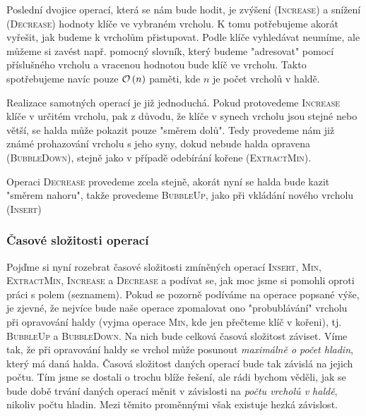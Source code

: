 Poslední dvojice operací, která se nám bude hodit, je zvýšení (\textsc{Increase}) a snížení (\textsc{Decrease}) hodnoty klíče ve vybraném vrcholu. K tomu potřebujeme akorát vyřešit, jak budeme k vrcholům přistupovat. Podle klíče vyhledávat neumíme, ale můžeme si zavést např. pomocný slovník, který budeme "adresovat" pomocí příslušného vrcholu a vracenou hodnotou bude klíč ve vrcholu. Takto spotřebujeme navíc pouze $\mathcal{O}\left(n\right)$ paměti, kde $n$ je počet vrcholů v haldě.

Realizace samotných operací je již jednoduchá. Pokud protovedeme \textsc{Increase} klíče v určitém vrcholu, pak z důvodu, že klíče v synech vrcholu jsou stejné nebo větší, se halda může pokazit pouze "směrem dolů". Tedy provedeme nám již známé prohazování vrcholu s jeho syny, dokud nebude halda opravena (\textsc{BubbleDown}), stejně jako v případě odebírání kořene (\textsc{ExtractMin}).

Operaci \textsc{Decrease} provedeme zcela stejně, akorát nyní se halda bude kazit "směrem nahoru", takže provedeme \textsc{BubbleUp}, jako při vkládání nového vrcholu (\textsc{Insert})

\subsubsection{Časové složitosti operací}

Pojďme si nyní rozebrat časové složitosti zmíněných operací \textsc{Insert}, \textsc{Min}, \textsc{ExtractMin}, \textsc{Increase} a \textsc{Decrease} a podívat se, jak moc jsme si pomohli oproti práci s polem (seznamem). Pokud se pozorně podíváme na operace popsané výše, je zjevné, že nejvíce bude naše operace zpomalovat ono "probublávání" vrcholu při opravování haldy (vyjma operace \textsc{Min}, kde jen přečteme klíč v kořeni), tj. \textsc{BubbleUp} a \textsc{BubbleDown}. Na nich bude celková časová složitost záviset.
Víme tak, že při opravování haldy se vrchol může posunout \emph{maximálně o počet hladin}, který má daná halda. Časová složitost daných operací bude tak závislá na jejich počtu. Tím jsme se dostali o trochu blíže řešení, ale rádi bychom věděli, jak se bude době trvání daných operací měnit v závislosti na \emph{počtu vrcholů v haldě}, nikoliv počtu hladin. Mezi těmito proměnnými však existuje hezká závislost.

